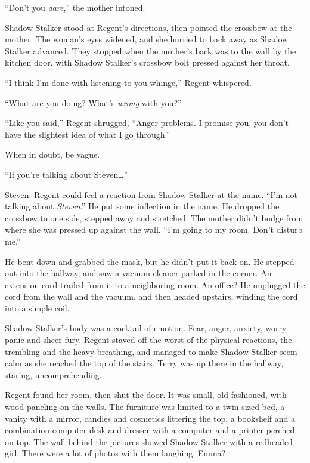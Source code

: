 ``Don't you \emph{dare},'' the mother intoned.



Shadow Stalker stood at Regent's directions, then pointed the crossbow at the mother.  The woman's eyes widened, and she hurried to back away as Shadow Stalker advanced.  They stopped when the mother's back was to the wall by the kitchen door, with Shadow Stalker's crossbow bolt pressed against her throat.



``I think I'm done with listening to you whinge,'' Regent whispered.



``What are you doing?  What's \emph{wrong} with you?''



``Like you said,'' Regent shrugged, ``Anger problems.  I promise you, you don't have the slightest idea of what I go through.''



When in doubt, be vague.



``If you're talking about Steven\ldots''



Steven.  Regent could feel a reaction from Shadow Stalker at the name.  ``I'm not talking about \emph{Steven}.''  He put some inflection in the name.  He dropped the crossbow to one side, stepped away and stretched.  The mother didn't budge from where she was pressed up against the wall.  ``I'm going to my room.  Don't disturb me.''



He bent down and grabbed the mask, but he didn't put it back on.  He stepped out into the hallway, and saw a vacuum cleaner parked in the corner.  An extension cord trailed from it to a neighboring room.  An office?  He unplugged the cord from the wall and the vacuum, and then headed upstairs, winding the cord into a simple coil.



Shadow Stalker's body was a cocktail of emotion.  Fear, anger, anxiety, worry, panic and sheer fury.  Regent staved off the worst of the physical reactions, the trembling and the heavy breathing, and managed to make Shadow Stalker seem calm as she reached the top of the stairs.  Terry was up there in the hallway, staring, uncomprehending.



Regent found her room, then shut the door.  It was small, old-fashioned, with wood paneling on the walls.  The furniture was limited to a twin-sized bed, a vanity with a mirror, candles and cosmetics littering the top, a bookshelf and a combination computer desk and dresser with a computer and a printer perched on top.  The wall behind the pictures showed Shadow Stalker with a redheaded girl.  There were a lot of photos with them laughing.  Emma?



